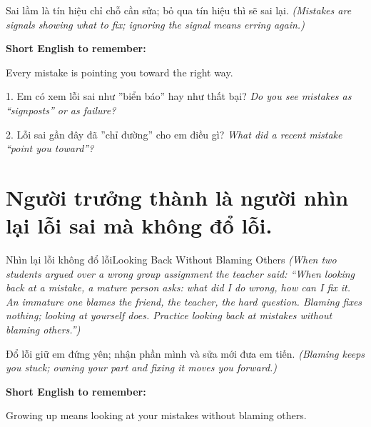 \begin{baihoc}
Sai lầm là tín hiệu chỉ chỗ cần sửa; bỏ qua tín hiệu thì sẽ sai lại.
\textit{(Mistakes are signals showing what to fix; ignoring the signal means erring again.)}
\end{baihoc}

\begin{ghinhoanh}
\textbf{Short English to remember:}

Every mistake is pointing you toward the right way.

\end{ghinhoanh}

\begin{tuhocnhanh}
1. Em có xem lỗi sai như ''biển báo'' hay như thất bại? \textit{Do you see mistakes as ``signposts'' or as failure?}

2. Lỗi sai gần đây đã ''chỉ đường'' cho em điều gì? \textit{What did a recent mistake ``point you toward''?}
\end{tuhocnhanh}
\ngancach

\section{Người trưởng thành là người nhìn lại lỗi sai mà không đổ lỗi.}
\begin{truyen}{Nhìn lại lỗi không đổ lỗi}{Looking Back Without Blaming Others}
\textit{(When two students argued over a wrong group assignment the teacher said: ``When looking back at a mistake, a mature person asks: what did I do wrong, how can I fix it. An immature one blames the friend, the teacher, the hard question. Blaming fixes nothing; looking at yourself does. Practice looking back at mistakes without blaming others.'')}
\end{truyen}

\begin{baihoc}
Đổ lỗi giữ em đứng yên; nhận phần mình và sửa mới đưa em tiến.
\textit{(Blaming keeps you stuck; owning your part and fixing it moves you forward.)}
\end{baihoc}

\begin{ghinhoanh}
\textbf{Short English to remember:}

Growing up means looking at your mistakes without blaming others.

\end{ghinhoanh}

